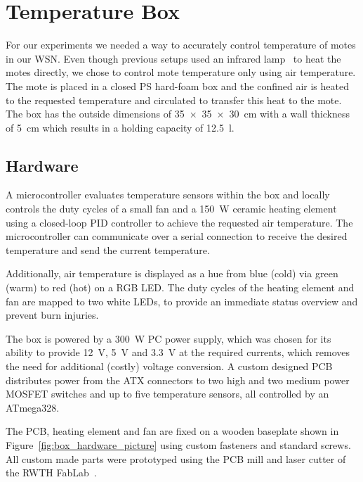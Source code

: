 \section{Temperature Box}
\label{sec:temperature_box}

For our experiments we needed a way to accurately control temperature of motes in our \ac{WSN}.
Even though previous setups used an infrared lamp~\cite{Boano2014, Hermans2013} to heat the motes directly, we chose to control mote temperature only using air temperature.
The mote is placed in a closed \ac{PS} hard-foam box and the confined air is heated to the requested temperature and circulated to transfer this heat to the mote.
The box has the outside dimensions of \SI{35 x 35 x 30}{\centi\metre} with a wall thickness of \SI{5}{\centi\metre} which results in a holding capacity of \SI{12.5}{\litre}.

\subsection{Hardware}
A microcontroller evaluates temperature sensors within the box and locally controls the duty cycles of a small fan and a \SI{150}{\watt} ceramic heating element using a closed-loop \acs{PID} controller to achieve the requested air temperature.
The microcontroller can communicate over a serial connection to receive the desired temperature and send the current temperature.

Additionally, air temperature is displayed as a hue from blue (cold) via green (warm) to red (hot) on a RGB LED.
The duty cycles of the heating element and fan are mapped to two white LEDs, to provide an immediate status overview and prevent burn injuries.

The box is powered by a \SI{300}{\watt} PC power supply, which was chosen for its ability to provide \SI{12}{\volt}, \SI{5}{\volt} and \SI{3.3}{\volt} at the required currents, which removes the need for additional (costly) voltage conversion.
A custom designed PCB distributes power from the \acs{ATX} connectors to two high and two medium power \acs{MOSFET} switches and up to five temperature sensors, all controlled by an ATmega328.

The PCB, heating element and fan are fixed on a wooden baseplate shown in Figure~\ref{fig:box_hardware_picture} using custom fasteners and standard screws.
All custom made parts were prototyped using the PCB mill and laser cutter of the RWTH FabLab~\cite{fablab}.

